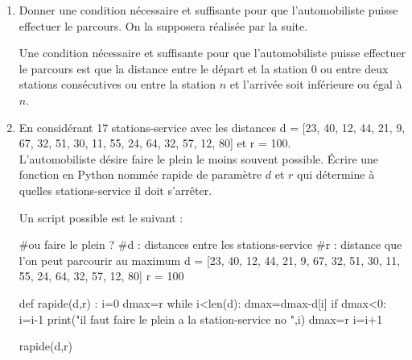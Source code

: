 \documentclass[12pt,french]{article}
\begin{document}
\begin{enumerate}
	\item Donner une condition nécessaire et suffisante pour que l'automobiliste puisse effectuer le
	parcours. On la supposera réalisée par la suite.	
	\begin{tcolorbox}[enhanced,attach boxed title to top center={yshift=-3mm,yshifttext=-1mm},
		colback=blue!5!white,colframe=blue!75!black,colbacktitle=blue!25!black,
		title=solution :, fonttitle=\bfseries,
		boxed title style={size=small,colframe=green!25!black} ]
	 Une condition nécessaire et suffisante pour que l'automobiliste puisse effectuer le
	parcours est que la distance entre le départ et la station 0 ou entre deux stations consécutives ou entre la station $n$ et l'arrivée soit inférieure ou égal à $n$.
\end{tcolorbox} 	
	\item En considérant 17 stations-service avec les distances d = [23, 40, 12, 44, 21, 9, 67, 32, 51, 30, 11, 55, 24,
	64, 32, 57, 12, 80] et r = 100.\\
	L'automobiliste désire faire le plein le moins souvent possible. Écrire une fonction en Python nommée rapide de paramètre $d$ et $r$ qui détermine à quelles stations-service il doit s'arrêter.	
		\begin{tcolorbox}[enhanced,attach boxed title to top center={yshift=-3mm,yshifttext=-1mm},
		colback=blue!5!white,colframe=blue!75!black,colbacktitle=blue!25!black,
		title=solution :, fonttitle=\bfseries,
		boxed title style={size=small,colframe=green!25!black} ]
 Un script possible est le suivant :
\begin{tcolorbox}[enhanced,attach boxed title to top center={yshift=-3mm,yshifttext=-1mm},
	colback=green!5!white,colframe=green!75!black,colbacktitle=green!25!black,
	title=fonction rapide, fonttitle=\bfseries,
	boxed title style={size=small,colframe=green!25!black} ]
\begin{pyconsole}
#ou faire le plein ?
#d : distances entre les stations-service
#r : distance que l'on peut parcourir au maximum
d = [23, 40, 12, 44, 21, 9, 67, 32, 51, 30, 11, 55, 24, 64, 32, 57, 12, 80]
r = 100

def rapide(d,r) :
	i=0
	dmax=r
	while i<len(d):
		dmax=dmax-d[i]
		if dmax<0:
			i=i-1
			print("il faut faire le plein a la station-service no ",i)
			dmax=r
		i=i+1

rapide(d,r)		
\end{pyconsole}
\end{tcolorbox}
\end{tcolorbox}
\end{enumerate}
\end{document}
